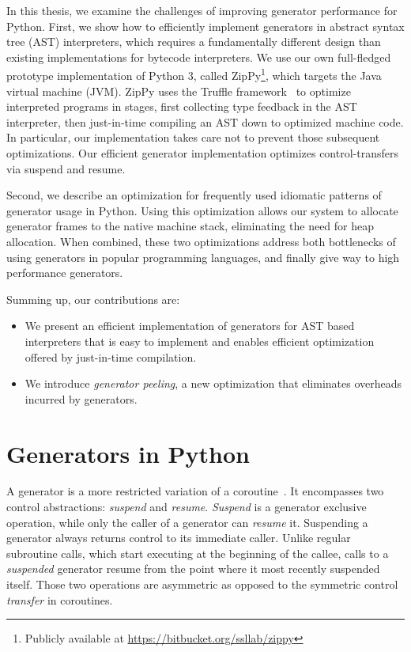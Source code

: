In this thesis, we examine the challenges of improving generator performance for Python.
First, we show how to efficiently implement generators in abstract syntax tree (AST) interpreters,
which requires a fundamentally different design than existing implementations for bytecode interpreters.
We use our own full-fledged prototype implementation of Python 3, called ZipPy\footnote{Publicly available at \url{https://bitbucket.org/ssllab/zippy}},
which targets the Java virtual machine (JVM).
ZipPy uses the Truffle framework~\cite{Wurthinger+13} to optimize interpreted programs in stages, first collecting type feedback in the AST interpreter,
then just-in-time compiling an AST down to optimized machine code.
In particular, our implementation takes care not to prevent those subsequent optimizations.
Our efficient generator implementation optimizes control-transfers via suspend and resume.

Second, we describe an optimization for frequently used idiomatic patterns of generator usage in Python.
Using this optimization allows our system to allocate generator frames to the native machine stack, eliminating the need for heap allocation.
When combined, these two optimizations address both bottlenecks of using generators in popular programming languages, and finally give way to high performance generators.

\noindent{}Summing up, our contributions are:

\begin{itemize}
\item We present an efficient implementation of generators for AST based interpreters that is easy to implement and enables efficient optimization offered by just-in-time compilation.
\item We introduce \emph{generator peeling}, a new optimization that eliminates overheads incurred by generators.
\end{itemize}

\section{Generators in Python}

A generator is a more restricted variation of a coroutine~\cite{grune1977view,Moura2009}.
It encompasses two control abstractions: \emph{suspend} and \emph{resume}.
\emph{Suspend} is a generator exclusive operation, while only the caller of a generator can \emph{resume} it.
Suspending a generator always returns control to its immediate caller.
Unlike regular subroutine calls, which start executing at the beginning of the callee, calls to a \emph{suspended} generator resume
from the point where it most recently suspended itself.
Those two operations are asymmetric as opposed to the symmetric control \emph{transfer} in coroutines.


